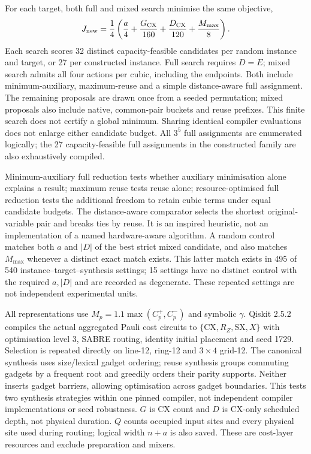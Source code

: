 \documentclass[a4paper,onecolumn,11pt,unpublished]{quantumarticle}
\theoremstyle{remark}
\begin{document}
For each target, both full and mixed search minimise the same objective,
\begin{equation}
 J_{\rm new}=\frac14\left(\frac{a}{4}+\frac{G_{\rm CX}}{160}
                    +\frac{D_{\rm CX}}{120}+\frac{M_{\max}}{8}\right).
 \label{eq:new-compiled-score}
\end{equation}
Each search scores 32 distinct capacity-feasible candidates per random
instance and target, or 27 per constructed instance. Full search requires
$D=E$; mixed search admits all four actions per cubic, including the
endpoints. Both include minimum-auxiliary, maximum-reuse and a simple
distance-aware full assignment. The remaining proposals are drawn once
from a seeded permutation; mixed proposals also include native, common-pair
buckets and reuse prefixes. This finite search does not certify a global
minimum. Sharing identical compiler evaluations does not enlarge either
candidate budget. All $3^5$ full assignments are enumerated logically;
the 27 capacity-feasible full assignments in the constructed family are
also exhaustively compiled.

Minimum-auxiliary full reduction tests whether auxiliary minimisation alone
explains a result; maximum reuse tests reuse alone; resource-optimised full
reduction tests the additional freedom to retain cubic terms under equal
candidate budgets. The distance-aware comparator selects the shortest
original-variable pair and breaks ties by reuse. It is an inspired heuristic,
not an implementation of a named hardware-aware algorithm. A random control
matches both $a$ and $|D|$ of the best strict mixed candidate, and also matches
$M_{\max}$ whenever a distinct exact match exists. This latter match exists
in 495 of 540 instance--target--synthesis settings; 15 settings have no
distinct control with the required $a,|D|$ and are recorded as degenerate.
These repeated settings are not independent experimental units.

All representations use $M_p=1.1\max(C_p^+,C_p^-)$ and symbolic $\gamma$.
Qiskit 2.5.2 compiles the actual aggregated Pauli cost circuits to
$\{\mathrm{CX},R_Z,\mathrm{SX},X\}$ with optimisation level 3, SABRE routing,
identity initial placement and seed 1729. Selection is repeated directly on
line-12, ring-12 and $3\times4$ grid-12. The canonical synthesis uses
size/lexical gadget ordering; reuse synthesis groups commuting gadgets by
a frequent root and greedily orders their parity supports. Neither inserts
gadget barriers, allowing optimisation across gadget boundaries. This tests
two synthesis strategies within one pinned compiler, not independent compiler
implementations or seed robustness. $G$ is CX count and $D$ is CX-only
scheduled depth, not physical duration. $Q$ counts occupied input sites and
every physical site used during routing; logical width $n+a$ is also saved.
These are cost-layer resources and exclude preparation and mixers.
\end{document}
